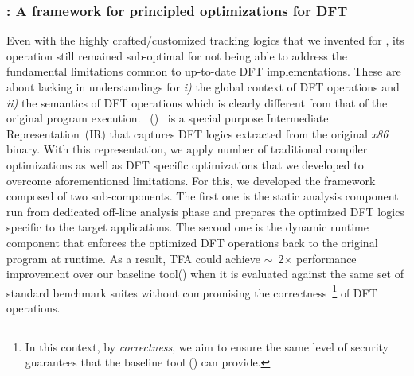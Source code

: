 \documentclass[letterpaper, 10pt]{article}
\begin{document}
\begin{small}
\subsubsection*{\TFA: A framework for principled optimizations for DFT}

Even with the highly crafted/customized tracking logics that we invented for
\libdft, its operation still remained sub-optimal for not being able to address
the fundamental limitations common to up-to-date DFT implementations. These are
about lacking in understandings for {\it i)} the global context of DFT
operations and {\it ii)} the semantics of DFT operations which is clearly
different from that of the original program execution.
%
\TFAFull~(\TFA)~\cite{tfa:2012ndss} is a special purpose Intermediate
Representation~(IR) that captures DFT logics extracted from the original {\it
x86} binary. With this representation, we apply number of traditional compiler
optimizations as well as DFT specific optimizations that we developed to
overcome aforementioned limitations.
%
For this, we developed the framework composed of two sub-components.
The first one is the static analysis component run from dedicated
off-line analysis phase and prepares the optimized DFT logics specific to the
target applications. The second one is the dynamic runtime component that
enforces the optimized DFT operations back to the original program at runtime.
%
%
As a result, TFA could achieve \(\sim\)~2\(\times\) performance improvement
over  our baseline tool(\libdft) when it is evaluated against the same set of
standard benchmark suites without compromising the correctness~\footnote{In
        this context, by {\it correctness}, we aim to ensure the same level of
security guarantees that the baseline tool (\libdft) can provide.} of DFT
operations.


\end{small}
\end{document}
